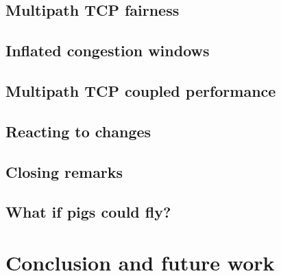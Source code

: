 \documentclass[12pt,a4paper]{article}
\begin{document}
\subsection{Multipath TCP fairness}
\label{sec:results-fairness}

\FloatBarrier
\clearpage
\subsection{Inflated congestion windows}
\label{sec:results-inflated}

\FloatBarrier
\clearpage
\subsection{Multipath TCP coupled performance}
\label{sec:results-performance}

\FloatBarrier
\clearpage
\subsection{Reacting to changes}
\label{sec:results-reacting}

\FloatBarrier
\clearpage
\subsection{Closing remarks}
\label{sec:results-closing-remarks}

\FloatBarrier

\subsection{What if pigs could fly?} %

\clearpage
\section{Conclusion and future work}

\end{document}
